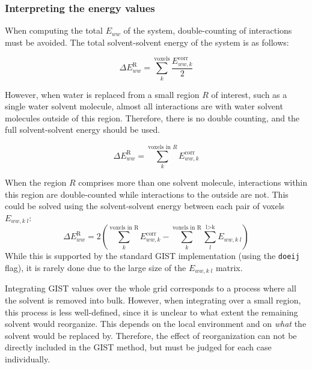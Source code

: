 \documentclass[9pt,tutorial]{livecoms}
\newcommand\inlinecode{\texttt}
\begin{document}
\subsubsection{Interpreting the energy values}
When computing the total $E_{ww}$ of the system, double-counting of interactions must be avoided.
The total solvent-solvent energy of the system is as follows:

\begin{equation}
	\Delta E^\text{R}_{ww} = \sum_{k}^\text{voxels} \frac{E_{ww,k}^\text{corr}}{2}
\end{equation}

However, when water is replaced from a small region $R$ of interest, such as a single water solvent molecule, almost all interactions are with water solvent molecules outside of this region.
Therefore, there is no double counting, and the full solvent-solvent energy should be used.

\begin{equation}
	\Delta E^\text{R}_{ww} = \sum_{k}^{\text{voxels in }R} E_{ww,k}^\text{corr}
\end{equation}

When the region $R$ comprises more than one solvent molecule, interactions within this region are double-counted while interactions to the outside are not.
This could be solved using the solvent-solvent energy between each pair of voxels $E_{ww,k\;l}$:
\begin{equation}
	\Delta E^\text{R}_{ww} = 2\left(\sum_{k}^\text{voxels in R} E_{ww,k}^\text{corr}-\sum_{k}^\text{voxels in R}\sum_{l}^\text{l>k} E_{ww, k\;l}\right)
\end{equation}
While this is supported by the standard GIST implementation (using the \inlinecode{doeij} flag), it is rarely done due to the large size of the $E_{ww,k\;l}$ matrix.

Integrating GIST values over the whole grid corresponds to a process where all the solvent is removed into bulk.
However, when integrating over a small region, this process is less well-defined, since it is unclear to what extent the remaining solvent would reorganize.
This depends on the local environment and on \emph{what} the solvent would be replaced by.
Therefore, the effect of reorganization can not be directly included in the GIST method, but must be judged for each case individually.
\end{document}
